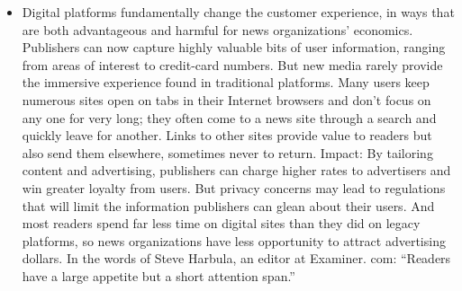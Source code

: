 \begin{itemize}
\item Digital platforms fundamentally change the customer experience, in
ways that are both advantageous and harmful for news organizations'
economics. Publishers can now capture highly valuable bits of user information,
ranging from areas of interest to credit-card numbers. But new media
rarely provide the immersive experience found in traditional platforms.
Many users keep numerous sites open on tabs in their Internet browsers and
don't focus on any one for very long; they often come to a news site through
a search and quickly leave for another. Links to other sites provide value to
readers but also send them elsewhere, sometimes never to return.
Impact: By tailoring content and advertising, publishers can charge higher
rates to advertisers and win greater loyalty from users. But privacy concerns
may lead to regulations that will limit the information publishers can glean
about their users. And most readers spend far less time on digital sites than
they did on legacy platforms, so news organizations have less opportunity to
attract advertising dollars. In the words of Steve Harbula, an editor at Examiner.
com: ``Readers have a large appetite but a short attention span.''
\end{itemize}
